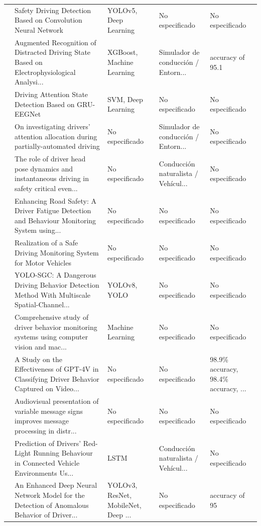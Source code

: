 \begin{table}[htbp]
\begin{tabular}{cp{7.5cm}p{2.8cm}p{2.8cm}p{2.8cm}}
\cite{liu2024safety} & Safety Driving Detection Based on Convolution Neural Network & YOLOv5, Deep Learning & No especificado & No especificado \\
\cite{qi2024augmented} & Augmented Recognition of Distracted Driving State Based on Electrophysiological Analysi... & XGBoost, Machine Learning & Simulador de conducción / Entorn... & accuracy of 95.1 \\
\cite{wu2024driving} & Driving Attention State Detection Based on GRU-EEGNet & SVM, Deep Learning & No especificado & No especificado \\
\cite{eddine2024investigating} & On investigating drivers’ attention allocation during partially-automated driving & No especificado & Simulador de conducción / Entorn... & No especificado \\
\cite{khattak2024role} & The role of driver head pose dynamics and instantaneous driving in safety critical even... & No especificado & Conducción naturalista / Vehícul... & No especificado \\
\cite{chadha2024enhancing} & Enhancing Road Safety: A Driver Fatigue Detection and Behaviour Monitoring System using... & No especificado & No especificado & No especificado \\
\cite{lin2024realization} & Realization of a Safe Driving Monitoring System for Motor Vehicles & No especificado & No especificado & No especificado \\
\cite{li2024yolosgc} & YOLO-SGC: A Dangerous Driving Behavior Detection Method With Multiscale Spatial-Channel... & YOLOv8, YOLO & No especificado & No especificado \\
\cite{qu2024comprehensive} & Comprehensive study of driver behavior monitoring systems using computer vision and mac... & Machine Learning & No especificado & No especificado \\
\cite{calenzani2024study} & A Study on the Effectiveness of GPT-4V in Classifying Driver Behavior Captured on Video... & No especificado & No especificado & 98.9\% accuracy, 98.4\% accuracy, ... \\
\cite{piruano2024audiovisual} & Audiovisual presentation of variable message signs improves message processing in distr... & No especificado & No especificado & No especificado \\
\cite{komol2024prediction} & Prediction of Drivers' Red-Light Running Behaviour in Connected Vehicle Environments Us... & LSTM & Conducción naturalista / Vehícul... & No especificado \\
\cite{khan2024enhanced} & An Enhanced Deep Neural Network Model for the Detection of Anomalous Behavior of Driver... & YOLOv3, ResNet, MobileNet, Deep ... & No especificado & accuracy of 95 \\

\end{tabular}
\end{table}
